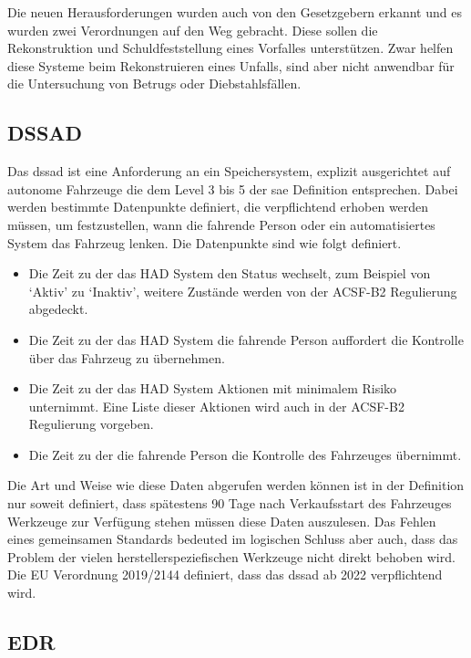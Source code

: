 \documentclass[conference,compsoc,final,a4paper]{IEEEtran}
\begin{document}
Die neuen Herausforderungen wurden auch von den Gesetzgebern erkannt und es wurden zwei Verordnungen auf den Weg gebracht.
Diese sollen die Rekonstruktion und Schuldfeststellung eines Vorfalles unterstützen.
Zwar helfen diese Systeme beim Rekonstruieren eines Unfalls, sind aber nicht anwendbar für die Untersuchung von Betrugs oder Diebstahlsfällen.~\cite{Boehm2020}

\subsection{DSSAD}

Das \ac{dssad} ist eine Anforderung an ein Speichersystem, explizit ausgerichtet auf autonome Fahrzeuge die dem Level 3 bis 5 der \ac{sae} Definition entsprechen.
Dabei werden bestimmte Datenpunkte definiert, die verpflichtend erhoben werden müssen, um festzustellen, wann die fahrende Person oder ein automatisiertes System das Fahrzeug lenken.
Die Datenpunkte sind wie folgt definiert.
\begin{itemize}
  \item Die Zeit zu der das \ac{HAD} System den Status wechselt, zum Beispiel von `Aktiv' zu `Inaktiv', weitere Zustände werden von der ACSF-B2 Regulierung abgedeckt.
  \item Die Zeit zu der das \ac{HAD} System die fahrende Person auffordert die Kontrolle über das Fahrzeug zu übernehmen.
  \item Die Zeit zu der das \ac{HAD} System Aktionen mit minimalem Risiko unternimmt. Eine Liste dieser Aktionen wird auch in der ACSF-B2 Regulierung vorgeben.
  \item Die Zeit zu der die fahrende Person die Kontrolle des Fahrzeuges übernimmt.
\end{itemize}

Die Art und Weise wie diese Daten abgerufen werden können ist in der Definition nur soweit definiert, dass spätestens 90 Tage nach Verkaufsstart des Fahrzeuges Werkzeuge
zur Verfügung stehen müssen diese Daten auszulesen. Das Fehlen eines gemeinsamen Standards bedeuted im logischen Schluss aber auch, dass das Problem der vielen
herstellerspeziefischen Werkzeuge nicht direkt behoben wird.\\
Die EU Verordnung 2019/2144 definiert, dass das \ac{dssad} ab 2022 verpflichtend wird.

\subsection{EDR}
\end{document}
